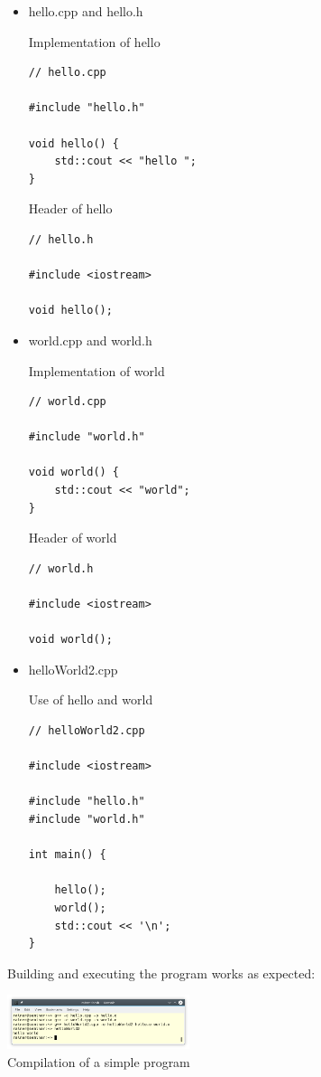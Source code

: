 \begin{itemize}
\item 
hello.cpp and hello.h

\noindent
Implementation of hello
\begin{lstlisting}[style=styleCXX]
// hello.cpp

#include "hello.h"

void hello() {
	std::cout << "hello ";
}
\end{lstlisting}

\noindent
Header of hello
\begin{lstlisting}[style=styleCXX]
// hello.h

#include <iostream>

void hello();
\end{lstlisting}

\item 
world.cpp and world.h

\noindent
Implementation of world
\begin{lstlisting}[style=styleCXX]
// world.cpp

#include "world.h"

void world() {
	std::cout << "world";
}
\end{lstlisting}

\noindent
Header of world
\begin{lstlisting}[style=styleCXX]
// world.h

#include <iostream>

void world();
\end{lstlisting}

\item 
helloWorld2.cpp

\noindent
Use of hello and world
\begin{lstlisting}[style=styleCXX]
// helloWorld2.cpp

#include <iostream>

#include "hello.h"
#include "world.h"

int main() {
	
	hello();
	world();
	std::cout << '\n';
}
\end{lstlisting}


\end{itemize}

Building and executing the program works as expected:

\begin{center}
\includegraphics[width=0.4\textwidth]{content/3/chapter4/images/14.png}\\
Compilation of a simple program
\end{center}


